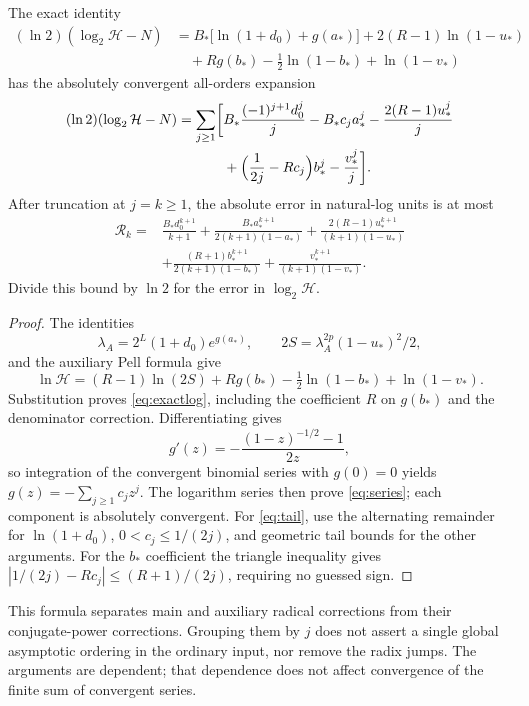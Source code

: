 \begin{theorem}\label{thm:forward}
The exact identity
\begin{align}
 (\ln2)(\log_2\mathcal H-N)
 &=B_*\bigl[\ln(1+d_0)+g(a_*)\bigr]
   +2(R-1)\ln(1-u_*)\nonumber\\
 &\quad+R g(b_*)-\tfrac12\ln(1-b_*)+\ln(1-v_*)\label{eq:exactlog}
\end{align}
has the absolutely convergent all-orders expansion
\begin{align}
 (\ln2)(\log_2\mathcal H-N)
 =\sum_{j\ge1}\biggl[&B_*\frac{(-1)^{j+1}d_0^j}{j}
 -B_*c_j a_*^j-\frac{2(R-1)u_*^j}{j}\nonumber\\
 &+\Bigl(\frac1{2j}-Rc_j\Bigr)b_*^j-\frac{v_*^j}{j}\biggr].
 \label{eq:series}
\end{align}
After truncation at $j=k\ge1$, the absolute error in natural-log
units is at most
\begin{align}
 \mathcal R_k={}&\frac{B_*d_0^{k+1}}{k+1}
 +\frac{B_*a_*^{k+1}}{2(k+1)(1-a_*)}
 +\frac{2(R-1)u_*^{k+1}}{(k+1)(1-u_*)}\nonumber\\
 &+\frac{(R+1)b_*^{k+1}}{2(k+1)(1-b_*)}
 +\frac{v_*^{k+1}}{(k+1)(1-v_*)}.\label{eq:tail}
\end{align}
Divide this bound by $\ln2$ for the error in $\log_2\mathcal H$.
\end{theorem}
\begin{proof}
The identities
\[
 \lambda_A=2^L(1+d_0)e^{g(a_*)},\qquad
 2S=\lambda_A^{2p}(1-u_*)^2/2,
\]
and the auxiliary Pell formula give
\[
 \ln\mathcal H=(R-1)\ln(2S)+R g(b_*)
 -\tfrac12\ln(1-b_*)+\ln(1-v_*).
\]
Substitution proves \eqref{eq:exactlog}, including the coefficient
$R$ on $g(b_*)$ and the denominator correction.
Differentiating gives
\[
 g'(z)=-\frac{(1-z)^{-1/2}-1}{2z},
\]
so integration of the convergent binomial series with $g(0)=0$
yields $g(z)=-\sum_{j\ge1}c_jz^j$. The logarithm series then
prove \eqref{eq:series}; each component is absolutely convergent.
For \eqref{eq:tail}, use the alternating remainder for $\ln(1+d_0)$,
$0<c_j\le1/(2j)$, and geometric tail bounds for the other arguments.
For the $b_*$ coefficient the triangle inequality gives
$|1/(2j)-Rc_j|\le(R+1)/(2j)$, requiring no guessed sign.
\end{proof}

This formula separates main and auxiliary radical corrections from
their conjugate-power corrections. Grouping them by $j$ does not
assert a single global asymptotic ordering in the ordinary input, nor
remove the radix jumps. The arguments are dependent; that dependence
does not affect convergence of the finite sum of convergent series.

